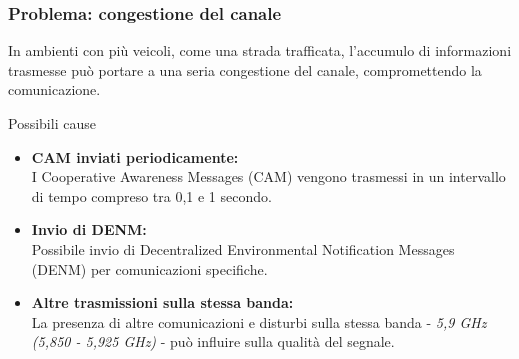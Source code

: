 \documentclass{beamer}
\begin{document}
\begin{frame}
\begin{columns}
\begin{column}{0.5\textwidth}
\begin{figure}[h!]
            \label{fig:obu_rsu}
        \end{figure}
    \end{column}
\end{columns}
\end{frame}

\begin{frame}
    \frametitle{Problema: congestione del canale}
    In ambienti con più veicoli, come una strada trafficata, l'accumulo di informazioni trasmesse può portare a una \alert{seria congestione del canale}, compromettendo la comunicazione.

    \begin{block}{Possibili cause}
        \begin{itemize}
            \item \textbf{CAM inviati periodicamente:} \\
            I Cooperative Awareness Messages (CAM) vengono trasmessi in un intervallo di tempo compreso tra 0,1 e 1 secondo.
            
            \item \textbf{Invio di DENM:} \\
            Possibile invio di Decentralized Environmental Notification Messages (DENM) per comunicazioni specifiche.
            
            \item \textbf{Altre trasmissioni sulla stessa banda:} \\
            La presenza di altre comunicazioni e disturbi sulla stessa banda - \textit{5,9 GHz (5,850 - 5,925 GHz)} - può influire sulla qualità del segnale.
        \end{itemize}
    \end{block}
    
\end{frame}
\end{document}
